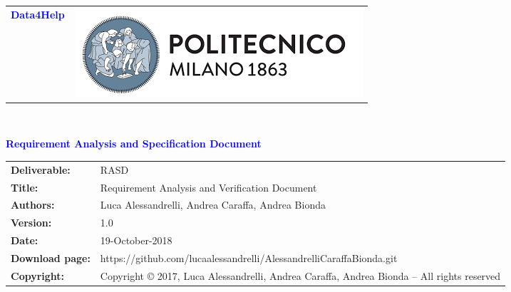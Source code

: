 
\usepackage{placeins}




\begin{titlepage}



{\begin{table}[t!]
\centering
\begin{tabu} to \textwidth { X[1.3,r,p] X[1.7,l,p] }
\textcolor{Blue}
{\textbf{\small{Data4Help}}} & \includegraphics[scale=0.5]{Images/PolimiLogo.png}
\end{tabu}
\end{table}}~\\ [7cm]


\begin{flushleft}

{\textcolor{Blue}{\textbf{\Huge{Requirement Analysis and Specification
        Document}}}} \\ [1cm]

\end{flushleft}

\end{titlepage}

\begin{table}[h!]
\begin{tabu} to \textwidth { X[0.3,r,p] X[0.7,l,p] }
\hline

\textbf{Deliverable:} & RASD\\
\textbf{Title:} & Requirement Analysis and Verification Document \\
\textbf{Authors:} & Luca Alessandrelli, Andrea Caraffa, Andrea Bionda \\
\textbf{Version:} & 1.0 \\ 
\textbf{Date:} & 19-October-2018 \\
\textbf{Download page:} & https://github.com/lucaalessandrelli/AlessandrelliCaraffaBionda.git \\
\textbf{Copyright:} & Copyright © 2017, Luca Alessandrelli, Andrea Caraffa, Andrea Bionda – All rights reserved \\
\hline
\end{tabu}
\end{table}




